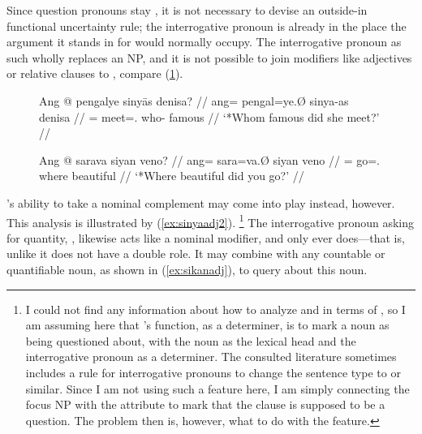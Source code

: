 Since question pronouns stay , it is not necessary to devise an
outside-in functional uncertainty rule; the interrogative pronoun is already in
the place the argument it stands in for would normally occupy. The
interrogative pronoun as such wholly replaces an NP, and it is not possible to
join modifiers like adjectives or relative clauses to , compare 
(\ref{ex:itradj}).

\begin{figure}[h]
\pex\label{ex:itradj}
\a\ljudge*\begingl
	\gla Ang @ pengalye sinyās denisa? //
	\glb ang= pengal=ye.Ø sinya-as denisa //
	\glc \AgtT{}= meet=\TsgF{}.\Top{} who-\Parg{} famous //
	\glft `*Whom famous did she meet?' //
\endgl

\a\ljudge*\begingl
	\gla Ang @ sarava siyan veno? //
	\glb ang= sara=va.Ø siyan veno //
	\glc \Aarg{}= go=\Second{}.\Top{} where beautiful //
	\glft `*Where beautiful did you go?' //
\endgl
\xe
\end{figure}

's ability to take a nominal complement may come into play
instead, however. This analysis is illustrated by (\ref{ex:sinyaadj2}).%
\footnote{I could not find any information about how to analyze  and
 in terms of \Lfg{}, so I am assuming here that 's function,
as a determiner, is to mark a noun as being questioned about, with the noun as
the lexical head and the interrogative pronoun as a determiner. The consulted
literature sometimes includes a rule for interrogative pronouns to change the
sentence type to  or similar. Since I am not using such a
feature here, I am simply connecting the focus NP with the \Q{} attribute to
mark that the clause is supposed to be a question. The problem then is,
however, what to do with the \Prontype{} feature.} The interrogative pronoun
asking for quantity, , likewise acts
like a nominal modifier, and only ever does---that is, unlike
 it does not have a double role. It may combine with any
countable or quantifiable noun, as shown in (\ref{ex:sikanadj}), to query about
this noun.

